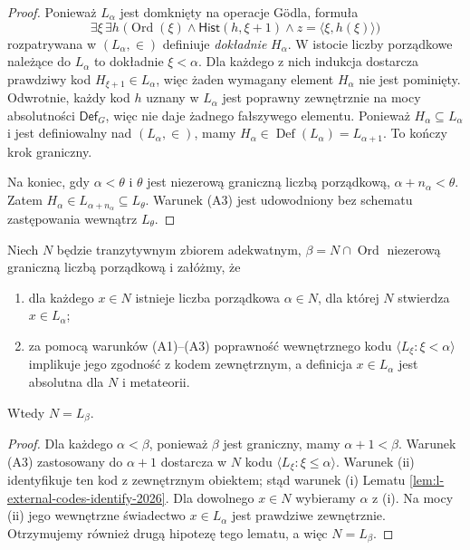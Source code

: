 \begin{proof}
Ponieważ $L_\alpha$ jest domknięty na operacje Gödla,
formuła
\[
 \exists\xi\,\exists h\;\bigl(
  \operatorname{Ord}(\xi)\land
  \mathsf{Hist}(h,\xi+1)\land
  z=\langle\xi,h(\xi)\rangle\bigr)
\]
rozpatrywana w $(L_\alpha,\in)$ definiuje
\emph{dokładnie} $H_\alpha$.
W istocie liczby porządkowe należące do $L_\alpha$
to dokładnie $\xi<\alpha$. Dla każdego z nich
indukcja dostarcza prawdziwy kod $H_{\xi+1}\in L_\alpha$,
więc żaden wymagany element $H_\alpha$ nie jest
pominięty. Odwrotnie, każdy kod $h$ uznany w
$L_\alpha$ jest poprawny zewnętrznie na mocy
absolutności $\mathsf{Def}_G$, więc nie daje
żadnego fałszywego elementu. Ponieważ
$H_\alpha\subseteq L_\alpha$ i jest definiowalny
nad $(L_\alpha,\in)$, mamy
$H_\alpha\in\operatorname{Def}(L_\alpha)=L_{\alpha+1}$.
To kończy krok graniczny.

Na koniec, gdy $\alpha<\theta$ i $\theta$ jest
niezerową graniczną liczbą porządkową,
$\alpha+n_\alpha<\theta$. Zatem
$H_\alpha\in L_{\alpha+n_\alpha}\subseteq L_\theta$.
Warunek (A3) jest udowodniony bez schematu
zastępowania wewnątrz $L_\theta$.
\end{proof}

\begin{lemat}
\label{lem:l-adequacy-to-external-codes-2026}
Niech $N$ będzie tranzytywnym zbiorem adekwatnym,
$\beta=N\cap\operatorname{Ord}$ niezerową graniczną
liczbą porządkową i załóżmy, że
\begin{enumerate}[label=(\roman*)]
\item dla każdego $x\in N$ istnieje liczba
  porządkowa $\alpha\in N$, dla której $N$
  stwierdza $x\in L_\alpha$;
\item za pomocą warunków (A1)--(A3) poprawność
  wewnętrznego kodu $\langle L_\xi:\xi<\alpha\rangle$
  implikuje jego zgodność z kodem zewnętrznym,
  a definicja $x\in L_\alpha$ jest absolutna
  dla $N$ i metateorii.
\end{enumerate}
Wtedy $N=L_\beta$.
\end{lemat}
\begin{proof}
Dla każdego $\alpha<\beta$, ponieważ $\beta$ jest
graniczny, mamy $\alpha+1<\beta$. Warunek (A3)
zastosowany do $\alpha+1$ dostarcza w $N$ kodu
$\langle L_\xi:\xi\leq\alpha\rangle$.
Warunek (ii) identyfikuje ten kod z zewnętrznym
obiektem; stąd warunek (i) Lematu
\ref{lem:l-external-codes-identify-2026}.
Dla dowolnego $x\in N$ wybieramy $\alpha$ z (i).
Na mocy (ii) jego wewnętrzne świadectwo
$x\in L_\alpha$ jest prawdziwe zewnętrznie.
Otrzymujemy również drugą hipotezę tego lematu,
a więc $N=L_\beta$.
\end{proof}

